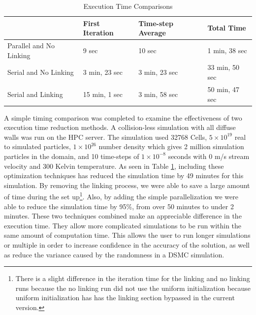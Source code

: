 \begin{table}
\caption{Execution Time Comparisons}
\label{tab:Timing}
\vspace{0.3cm}
\begin{center}
\begin{tabular}{|l|l|l|l|}
\hline
                             & First Iteration & Time-step Average & Total Time     \\ \hline
Parallel and No Linking & 9 sec           & 10 sec           & 1 min, 38 sec  \\ \hline
Serial and No Linking   & 3 min, 23 sec   & 3 min, 23 sec    & 33 min, 50 sec \\ \hline
Serial and Linking      & 15 min, 1 sec   &  3 min, 58 sec   &   50 min, 47 sec             \\ \hline
\end{tabular}
\end{center}
\end{table}

\indent A simple timing comparison was completed to examine the effectiveness of two execution time reduction methods. A collision-less simulation with all diffuse walls was run on the HPC server. The simulation used 32768 Cells, \(5 \times 10^{19}\) real to simulated particles, \(1 \times 10^{26}\) number density which gives 2 million simulation particles in the domain, and 10 time-steps of \(1 \times 10^{-8}\) seconds with 0 m/s stream velocity and 300 Kelvin temperature. As seen in Table \ref{tab:Timing}, including these optimization techniques has reduced the simulation time by 49 minutes for this simulation. By removing the linking process, we were able to save a large amount of time during the set up\footnote{There is a slight difference in the iteration time for the linking and no linking runs because the no linking run did not use the uniform initialization because uniform initialization has has the linking section bypassed in the current version.}. Also, by adding the simple parallelization we were able to reduce the simulation time by 95\%, from over 50 minutes to under 2 minutes. These two techniques combined make an appreciable difference in the execution time. They allow more complicated simulations to be run within the same amount of computation time. This allows the user to run longer simulations or multiple in order to increase confidence in the accuracy of the solution, as well as reduce the variance caused by the randomness in a DSMC simulation. \par

